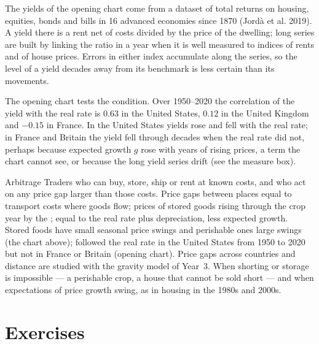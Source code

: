 \begin{measure}
The yields of the opening chart come from a dataset of total returns on
housing, equities, bonds and bills in 16 advanced economies since 1870
(Jordà et al. 2019). %
A yield there is a rent net of costs divided by the price of the
dwelling; long series are built by linking the ratio in a year when it is
well measured to indices of rents and of house prices. Errors in either
index accumulate along the series, so the level of a yield decades away
from its benchmark is less certain than its movements.
\end{measure}

The opening chart tests the condition. Over 1950--2020 the correlation of
the yield with the real rate is $0.63$ in the United States, $0.12$ in the
United Kingdom and $-0.15$ in France. %
In the United States yields rose and fell with the real rate; in France and
Britain the yield fell through decades when the real rate did not, perhaps
because expected growth $g$ rose with years of rising prices, a term the
chart cannot see, or because the long yield series drift (see the measure
box).

\begin{model}{Arbitrage}
\assumes Traders who can buy, store, ship or rent at known costs, and who
act on any price gap larger than those costs.
\predicts Price gaps between places equal to transport costs where goods
flow; prices of stored goods rising through the crop year by the ;  equal to the real rate plus depreciation, less
expected growth.
\tested Stored foods have small seasonal price swings and perishable ones
large swings (the chart above);  followed the real rate in
the United States from 1950 to 2020 but not in France or Britain (opening
chart). Price gaps across countries and distance are studied with the
gravity model of Year~3.
\breaks When shorting or storage is impossible --- a perishable crop, a
house that cannot be sold short --- and when expectations of price growth
swing, as in housing in the 1980s and 2000s.
\end{model}

\section*{Exercises}\label{sec:b1:price-theory-at-work:exercises}

